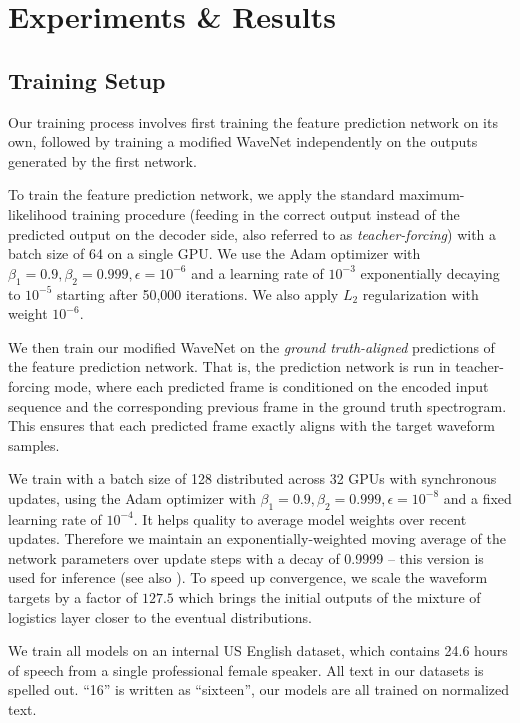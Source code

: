 \section{Experiments \& Results}
\label{sec:experiments}

\subsection{Training Setup}
Our training process involves first training the feature prediction network
on its own, followed by training a modified WaveNet independently on the outputs
generated by the first network.

To train the feature prediction network, we apply the standard
maximum-likelihood training procedure (feeding in the
correct output instead of the predicted output on the decoder side, also
referred to as {\em teacher-forcing})
with a batch size of 64 on a single GPU. We use the Adam optimizer
\cite{DBLP:journals/corr/KingmaB14} with
$\beta_1=0.9, \beta_2=0.999, \epsilon=10^{-6}$ and a learning rate of
$10^{-3}$ exponentially decaying to $10^{-5}$ starting after 50,000 iterations.
We also apply $L_2$ regularization with weight $10^{-6}$.

We then train our modified WaveNet on the \emph{ground truth-aligned}
predictions of the feature prediction network.
That is, the prediction network is run in teacher-forcing mode,
where each predicted frame is conditioned on the encoded input sequence and the
corresponding previous frame in the ground truth spectrogram. This ensures that
each predicted frame exactly aligns with the target waveform samples.

We train with a batch size of 128 distributed across 32 GPUs
with synchronous updates, using the Adam optimizer with
$\beta_1=0.9, \beta_2=0.999, \epsilon=10^{-8}$ and a fixed learning rate of
$10^{-4}$. It helps quality to average model weights over recent updates.  Therefore
we maintain an exponentially-weighted moving average of the network parameters
over update steps with a decay of 0.9999 -- this version is used for inference
(see also \cite{DBLP:journals/corr/KingmaB14}).
To speed up convergence, we scale the waveform targets by a factor of $127.5$
which brings the initial outputs of the mixture of logistics layer closer to
the eventual distributions.

We train all models on an internal US English dataset\cite{46150}, which
contains 24.6 hours of speech from a single professional female speaker.
All text in our datasets is spelled out. \eg ``16'' is written as ``sixteen'',
\ie our models are all trained on normalized text.

